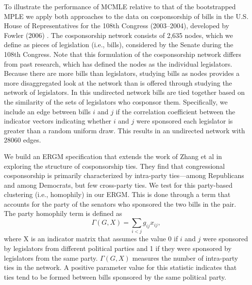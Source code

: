 \documentclass[10pt, conference, compsocconf]{IEEEtran}
\begin{document}
To illustrate the performance of MCMLE relative to that of the bootstrapped MPLE we apply both approaches to the data on cosponsorship of bills in the U.S. House of Representatives for the 108th Congress (2003--2004), developed by Fowler (2006) \cite{Fowler2006a} \cite{Fowler2006b}. The cosponsorship network consists of 2,635 nodes, which we define as pieces of legislation (i.e., bills), considered by the Senate during the 108th Congress. Note that this formulation of the cosponsorship network differs from past research, which has defined the nodes as the individual legislators. Because there are more bills than legislators, studying bills as nodes provides a more disaggregated look at the network than is offered through studying the network of legislators. In this undirected network bills are tied together based on the similarity of the sets of legislators who cosponsor them. Specifically, we include an edge between bills $i$ and $j$ if the correlation coefficient between the indicator vectors indicating whether $i$ and $j$ were sponsored each legislator is greater than a random uniform draw. This results in an undirected network with $28060$ edges.

We build an ERGM specification that extends the work of  Zhang et al\cite{zhang2008community} in exploring the structure of cosponsorship ties. They find that congressional cosponsorship is primarily characterized by intra-party ties---among Republicans and among Democrats, but few cross-party ties. We test for this party-based clustering (i.e., homophily) in our ERGM. This is done through a term that accounts for the party of the senators who sponsored the two bills in the pair. The party homophily term is defined as $$ \Gamma(G,X) = \sum_{i < j} g_{ij}x_{ij},$$ where X is an indicator matrix that assumes the value 0 if $i$ and $j$ were sponsored by legislators from different political parties and 1 if they were sponsored by legislators from the same party.  $\Gamma(G,X)$ measures the number of intra-party ties in the network. A positive parameter value for this statistic indicates that ties tend to be formed between bills sponsored by the same political party.
\end{document}

